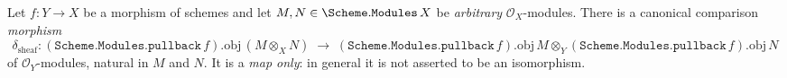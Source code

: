 

\begin{lemma}


  \label{lem:pullback_tensor_map}
  Let \(f : Y \to X\) be a morphism of schemes and let
  \(M, N \in \Scheme.\mathtt{Modules}\,X\) be \emph{arbitrary} \(\mathcal{O}_X\)-modules.
  There is a canonical comparison \emph{morphism}
  \[
    \delta_{\mathrm{sheaf}} :
      (\mathtt{Scheme.Modules.pullback}\,f).\mathrm{obj}\,(M \otimes_X N)
      \;\longrightarrow\;
      (\mathtt{Scheme.Modules.pullback}\,f).\mathrm{obj}\,M
        \otimes_Y (\mathtt{Scheme.Modules.pullback}\,f).\mathrm{obj}\,N
  \]
  of \(\mathcal{O}_Y\)-modules, natural in \(M\) and \(N\). It is a \emph{map only}: in
  general it is not asserted to be an isomorphism.
\end{lemma}

